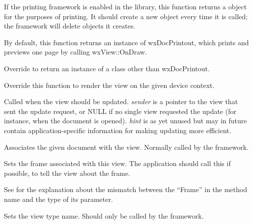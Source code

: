\label{wxviewoncreateprintout}


If the printing framework is enabled in the library, this function returns a
\rtfsp{} object for the purposes of printing. It should create a new object
every time it is called; the framework will delete objects it creates.

By default, this function returns an instance of wxDocPrintout, which prints
and previews one page by calling wxView::OnDraw.

Override to return an instance of a class other than wxDocPrintout.

\label{onviewondraw}


Override this function to render the view on the given device context.

\label{onviewonupdate}


Called when the view should be updated. {\it sender} is a pointer to the view
that sent the update request, or NULL if no single view requested the update (for instance,
when the document is opened). {\it hint} is as yet unused but may in future contain
application-specific information for making updating more efficient.

\label{wxviewsetdocument}


Associates the given document with the view. Normally called by the
framework.

\label{wxviewsetframe}


Sets the frame associated with this view. The application should call this
if possible, to tell the view about the frame.

See  for the explanation about the mismatch
between the ``Frame'' in the method name and the type of its parameter.

\label{wxviewsetviewname}


Sets the view type name. Should only be called by the framework.


